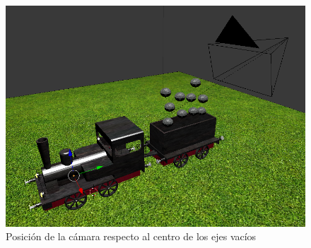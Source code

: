 \documentclass{article}
\begin{document}
\begin{figure}
    \centering
    \includegraphics[width=\textwidth]{images/camera-position.png}
    \caption{Posición de la cámara respecto al centro de los ejes vacíos}
    \label{fig:camera-position}
\end{figure}
\end{document}
